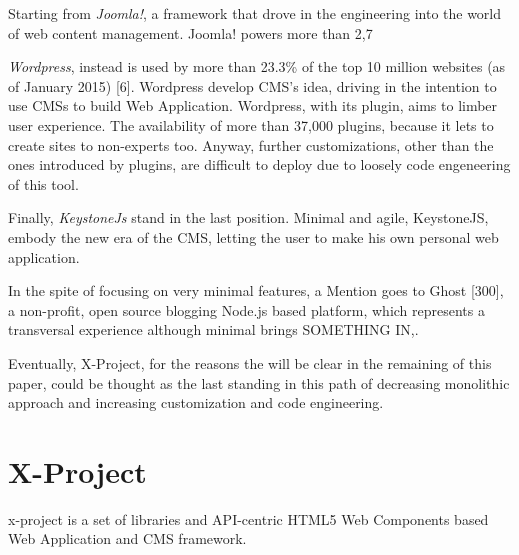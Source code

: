 \documentclass{sig-alternate}
\begin{document}
Starting from \emph{Joomla!}, a framework that drove in the engineering into the world of web content management. Joomla! powers more than 2,7%




\emph{Wordpress}, instead is used by more than 23.3\% of the top 10 million websites (as of January 2015) [6]. Wordpress develop CMS’s idea, driving in the intention to use CMSs to build Web Application. Wordpress, with its plugin, aims to limber user experience. The availability of more than 37,000 plugins, because it lets to create sites to non-experts too.
Anyway, further customizations, other than the ones introduced by plugins, are difficult to deploy due to loosely code engeneering of this tool.


Finally, \emph{KeystoneJs} stand in the last position. Minimal and agile, KeystoneJS, embody the new era of the CMS, letting the user to make his own personal web application.


In the spite of focusing on very minimal features, a Mention goes to Ghost \cite{ghost}[300], a non-profit, open source blogging Node.js based platform, which represents a transversal experience although minimal brings SOMETHING IN,.


Eventually, X-Project, for the reasons the will be clear in the remaining of this paper, could be thought as the last standing in this path of decreasing monolithic approach and increasing customization and code engineering.

















\section{X-Project}
x-project is a set of libraries and API-centric HTML5 Web Components based Web Application and CMS framework.
\end{document}
